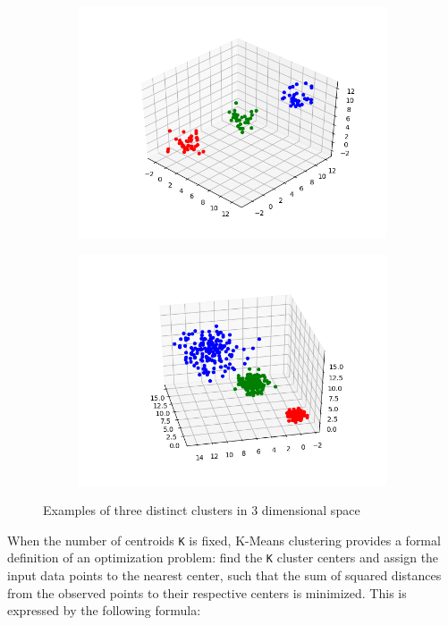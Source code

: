 \documentclass{l4proj}
\begin{document}
\begin{figure}[H]
\label{basic clusters}
\centering
\begin{subfigure}{.5\textwidth}
  \centering
  \includegraphics[width=1.2\linewidth]{images/figure_1}
  \label{fig:sub1}
\end{subfigure}%
\begin{subfigure}{.5\textwidth}
  \centering
  \includegraphics[width=1.2\linewidth]{images/figure_2}
  \label{fig:sub2}
\end{subfigure}
\caption{Examples of three distinct clusters in 3 dimensional space}
\label{fig:test}
\end{figure}

When the number of centroids \texttt{K} is fixed, K-Means clustering provides a formal definition of an optimization problem: find the \texttt{K} cluster centers and assign the input data points to the nearest center, such that the sum of squared distances from the observed points to their respective centers is minimized. This is expressed by the following formula:
\end{document}
